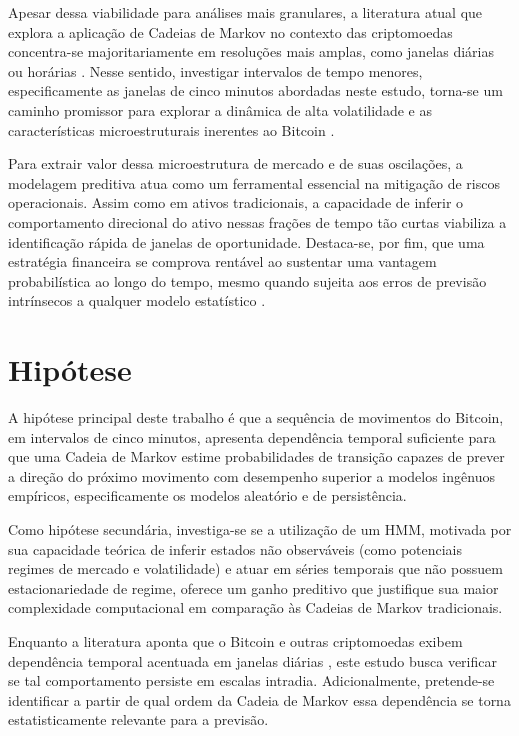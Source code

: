 \documentclass[
    12pt,                %
    openright,           %
    oneside,             %
    a4paper,             %
    english,             %
    brazil               %
]{abntex2}
\begin{document}
Apesar dessa viabilidade para análises mais granulares, a literatura atual que explora a aplicação de Cadeias de Markov no contexto das criptomoedas concentra-se majoritariamente em resoluções mais amplas, como janelas diárias \cite{NASCIMENTO} ou horárias \cite{ARAUJO}. Nesse sentido, investigar intervalos de tempo menores, especificamente as janelas de cinco minutos abordadas neste estudo, torna-se um caminho promissor para explorar a dinâmica de alta volatilidade e as características microestruturais inerentes ao Bitcoin \cite{catania2019bitcoin}.

Para extrair valor dessa microestrutura de mercado e de suas oscilações, a modelagem preditiva atua como um ferramental essencial na mitigação de riscos operacionais. Assim como em ativos tradicionais, a capacidade de inferir o comportamento direcional do ativo nessas frações de tempo tão curtas viabiliza a identificação rápida de janelas de oportunidade. Destaca-se, por fim, que uma estratégia financeira se comprova rentável ao sustentar uma vantagem probabilística ao longo do tempo, mesmo quando sujeita aos erros de previsão intrínsecos a qualquer modelo estatístico \cite{Silva2021}.

\section{Hipótese}

A hipótese principal deste trabalho é que a sequência de movimentos do Bitcoin,
em intervalos de cinco minutos, apresenta dependência temporal suficiente para que uma
Cadeia de Markov estime probabilidades de transição capazes de prever a direção
do próximo movimento com desempenho superior a modelos ingênuos empíricos, 
especificamente os modelos aleatório e de persistência.

Como hipótese secundária, investiga-se se a utilização de um HMM, motivada por sua capacidade 
teórica de inferir estados não observáveis (como potenciais regimes de mercado e volatilidade) e atuar
em séries temporais que não possuem estacionariedade de regime,
oferece um ganho preditivo que justifique sua maior complexidade computacional em comparação às 
Cadeias de Markov tradicionais.

Enquanto a literatura aponta que o Bitcoin e outras criptomoedas exibem dependência
temporal acentuada em janelas diárias \cite{NASCIMENTO}, este estudo busca
verificar se tal comportamento persiste em escalas intradia. Adicionalmente, 
pretende-se identificar a partir de qual ordem da Cadeia de Markov essa dependência 
se torna estatisticamente relevante para a previsão.
\end{document}
